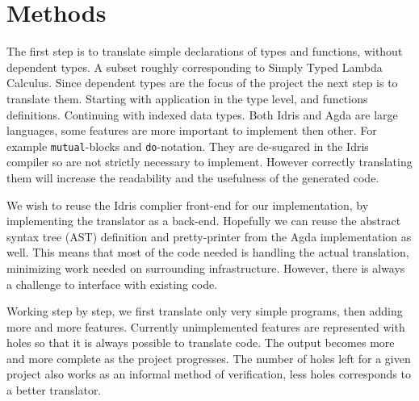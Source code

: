 \chapter{Methods}

The first step is to translate simple declarations of types and functions,
without dependent types. A subset roughly corresponding to Simply Typed Lambda
Calculus. Since dependent types are the focus of the project the next step is
to translate them. Starting with application in the type level, and functions
definitions. Continuing with indexed data types.
Both Idris and Agda are large languages, some features are more important to
implement then other.  For example \texttt{mutual}-blocks and
\texttt{do}-notation. They are de-sugared in the Idris compiler so are not
strictly necessary to implement. However correctly translating them will
increase the readability and the usefulness of the generated code.





We wish to reuse the Idris complier front-end for our implementation, by
implementing the translator as a back-end. Hopefully we can reuse the abstract
syntax tree (AST) definition and pretty-printer from the Agda implementation as
well. This means that most of the code needed is handling the actual
translation, minimizing work needed on surrounding infrastructure.  However,
there is always a challenge to interface with existing code.


Working step by step, we first translate only very simple programs, then adding
more and more features. Currently unimplemented features are represented with
holes so that it is always possible to translate code. The output becomes more
and more complete as the project progresses. The number of holes left for
a given project also works as an informal method of verification, less holes
corresponds to a better translator.

